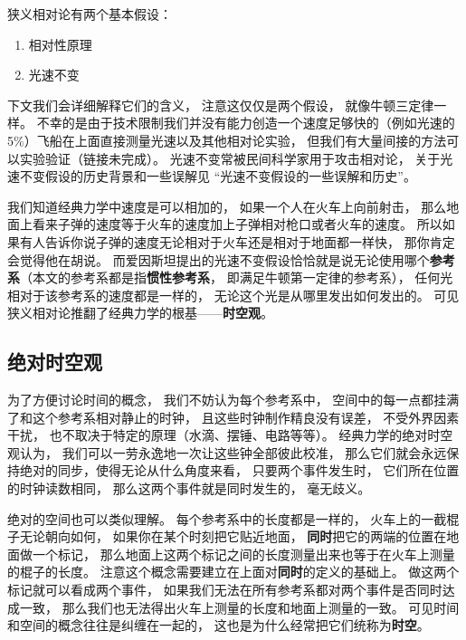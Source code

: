 

狭义相对论有两个基本假设：
\begin{enumerate}
\item 相对性原理
\item 光速不变
\end{enumerate}
下文我们会详细解释它们的含义， 注意这仅仅是两个假设， 就像牛顿三定律一样。 不幸的是由于技术限制我们并没有能力创造一个速度足够快的（例如光速的 5\%）飞船在上面直接测量光速以及其他相对论实验， 但我们有大量间接的方法可以实验验证（链接未完成）。 光速不变常被民间科学家用于攻击相对论， 关于光速不变假设的历史背景和一些误解见 “光速不变假设的一些误解和历史”。

我们知道经典力学中速度是可以相加的， 如果一个人在火车上向前射击， 那么地面上看来子弹的速度等于火车的速度加上子弹相对枪口或者火车的速度。 所以如果有人告诉你说子弹的速度无论相对于火车还是相对于地面都一样快， 那你肯定会觉得他在胡说。 而爱因斯坦提出的光速不变假设恰恰就是说无论使用哪个\textbf{参考系}（本文的参考系都是指\textbf{惯性参考系}， 即满足牛顿第一定律的参考系）， 任何光相对于该参考系的速度都是一样的， 无论这个光是从哪里发出如何发出的。 可见狭义相对论推翻了经典力学的根基——\textbf{时空观}。

\subsection{绝对时空观} \label{sub_Relat0_1}
为了方便讨论时间的概念， 我们不妨认为每个参考系中， 空间中的每一点都挂满了和这个参考系相对静止的时钟， 且这些时钟制作精良没有误差， 不受外界因素干扰， 也不取决于特定的原理（水滴、摆锤、电路等等）。 经典力学的绝对时空观认为， 我们可以一劳永逸地一次让这些钟全部彼此校准， 那么它们就会永远保持绝对的同步，使得无论从什么角度来看， 只要两个事件发生时， 它们所在位置的时钟读数相同， 那么这两个事件就是同时发生的， 毫无歧义。

绝对的空间也可以类似理解。 每个参考系中的长度都是一样的， 火车上的一截棍子无论朝向如何， 如果你在某个时刻把它贴近地面， \textbf{同时}把它的两端的位置在地面做一个标记， 那么地面上这两个标记之间的长度测量出来也等于在火车上测量的棍子的长度。 注意这个概念需要建立在上面对\textbf{同时}的定义的基础上。 做这两个标记就可以看成两个事件， 如果我们无法在所有参考系都对两个事件是否同时达成一致， 那么我们也无法得出火车上测量的长度和地面上测量的一致。 可见时间和空间的概念往往是纠缠在一起的， 这也是为什么经常把它们统称为\textbf{时空}。

